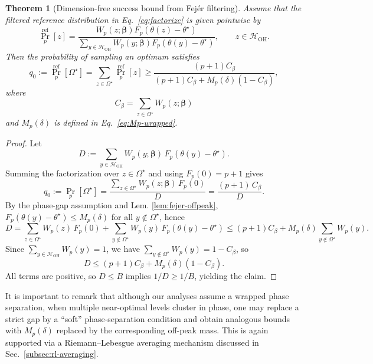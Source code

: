\documentclass[a4paper,unpublished,onecolumn,11pt]{quantumarticle}
\newtheorem{theorem}{Theorem}
\theoremstyle{definition}
\theoremstyle{remark}
\newcommand{\OH}{\mathcal{H}_{\mathrm{OH}}}
\begin{document}



\begin{theorem}[Dimension-free success bound from Fej\'er filtering]
\label{thm:dimension-free-success}
Assume that the filtered reference distribution in
Eq.~\eqref{eq:factorize} is given pointwise by
\begin{equation}
\label{eq:reference-law-normalized}
\Pr_p^{\mathrm{ref}}[z]
=
\frac{
W_p(z;\boldsymbol\beta)
F_p(\theta(z)-\theta^\star)
}{
\displaystyle
\sum_{y\in\mathcal H_{\mathrm{OH}}}
W_p(y;\boldsymbol\beta)
F_p(\theta(y)-\theta^\star)
},
\qquad
z\in\mathcal H_{\mathrm{OH}}.
\end{equation}
Then the probability of sampling an optimum satisfies
\begin{equation}
\label{eq:dimension-free-success}
q_0
:=
\Pr_p^{\mathrm{ref}}[\Omega^\star]
=
\sum_{z\in\Omega^\star}
\Pr_p^{\mathrm{ref}}[z]
\ge
\frac{(p+1)C_\beta}
{(p+1)C_\beta+M_p(\delta)(1-C_\beta)},
\end{equation}
where
\[
C_\beta
=
\sum_{z\in\Omega^\star}
W_p(z;\boldsymbol\beta)
\]
and $M_p(\delta)$ is defined in
Eq.~\eqref{eq:Mp-wrapped}.
\end{theorem}


\begin{proof}
Let
\[
D:=\sum_{y\in\OH}W_p(y;\boldsymbol\beta)\,F_p(\theta(y)-\theta^\star).
\]
Summing the factorization over $z\in\Omega^\star$ and using $F_p(0)=p+1$ gives
\[
q_0:=\Pr_p[\Omega^\star]
=\frac{\sum_{z\in\Omega^\star}W_p(z;\boldsymbol\beta)\,F_p(0)}{D}
=\frac{(p+1)\,C_\beta}{D}.
\]
By the phase-gap assumption and Lem. \ref{lem:fejer-offpeak}, $F_p(\theta(y)-\theta^\star)\le M_p(\delta)$ for all
$y\notin\Omega^\star$, hence
\[
D
=\sum_{z\in\Omega^\star}W_p(z)\,F_p(0)+\sum_{y\notin\Omega^\star}W_p(y)\,F_p(\theta(y)-\theta^\star)
\le (p+1)C_\beta + M_p(\delta)\sum_{y\notin\Omega^\star}W_p(y).
\]
Since $\sum_{y\in\OH}W_p(y)=1$, we have $\sum_{y\notin\Omega^\star}W_p(y)=1-C_\beta$, so
\[
D\le (p+1)C_\beta + M_p(\delta)(1-C_\beta).
\]
All terms are positive, so $D\le B$ implies $1/D\ge 1/B$, yielding the claim.
\end{proof}




It is important to remark that although our analyses assume a wrapped phase separation, when multiple near-optimal levels cluster in phase, one may replace a strict gap by a ``soft'' phase-separation condition and obtain analogous bounds with $M_p(\delta)$ replaced by the corresponding off-peak mass. This is again supported via  a Riemann--Lebesgue averaging mechanism discussed in  Sec.~\ref{subsec:rl-averaging}.
\end{document}
